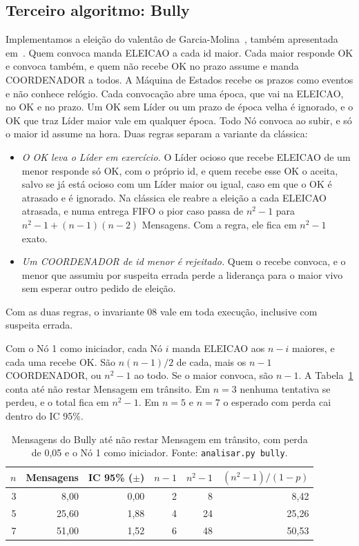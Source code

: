 \documentclass[conference]{IEEEtran}
\newcommand{\cod}[1]{\texttt{\upshape #1}}
\begin{document}
\subsection{Terceiro algoritmo: Bully}
Implementamos a eleição do valentão de Garcia-Molina~\cite{garciamolina}, também apresentada
em~\cite{vansteen}. Quem convoca manda ELEICAO a cada id maior. Cada maior responde OK e convoca
também, e quem não recebe OK no prazo assume e manda COORDENADOR a todos. A Máquina de Estados
recebe os prazos como eventos e não conhece relógio. Cada convocação abre uma época, que vai na
ELEICAO, no OK e no prazo. Um OK sem Líder ou um prazo de época velha é ignorado, e o OK que traz
Líder maior vale em qualquer época. Todo Nó convoca ao subir, e só o maior id assume na hora. Duas
regras separam a variante da clássica:
\begin{itemize}
\item \emph{O OK leva o Líder em exercício.} O Líder ocioso que recebe ELEICAO de um menor responde
só OK, com o próprio id, e quem recebe esse OK o aceita, salvo se já está ocioso com um Líder maior
ou igual, caso em que o OK é atrasado e é ignorado. Na clássica ele reabre a eleição a cada
ELEICAO atrasada, e numa entrega FIFO o pior caso passa de $n^2-1$ para $n^2-1+(n-1)(n-2)$
Mensagens. Com a regra, ele fica em $n^2-1$ exato.
\item \emph{Um COORDENADOR de id menor é rejeitado.} Quem o recebe convoca, e o menor que assumiu
por suspeita errada perde a liderança para o maior vivo sem esperar outro pedido de eleição.
\end{itemize}
Com as duas regras, o invariante 08 vale em toda execução, inclusive com suspeita errada.

Com o Nó 1 como iniciador, cada Nó $i$ manda ELEICAO aos $n-i$ maiores, e cada uma recebe OK. São
$n(n-1)/2$ de cada, mais os $n-1$ COORDENADOR, ou $n^2-1$ ao todo. Se o maior convoca, são $n-1$.
A Tabela~\ref{tab:bully} conta
até não restar Mensagem em trânsito. Em $n=3$ nenhuma tentativa se perdeu, e o total fica em
$n^2-1$. Em $n=5$ e $n=7$ o esperado com perda cai dentro do IC 95\%.

\begin{table}[t]
\caption{Mensagens do Bully até não restar Mensagem em trânsito, com perda de 0,05 e o Nó 1 como
iniciador. Fonte: \cod{analisar.py bully}.}
\label{tab:bully}
\centering
\footnotesize
\begin{tabular}{@{}rrrrrr@{}}
\toprule
$n$ & Mensagens & IC 95\% ($\pm$) & $n-1$ & $n^2-1$ & $(n^2-1)/(1-p)$ \\
\midrule
3 & 8,00  & 0,00 & 2 & 8  & 8,42  \\
5 & 25,60 & 1,88 & 4 & 24 & 25,26 \\
7 & 51,00 & 1,52 & 6 & 48 & 50,53 \\
\bottomrule
\end{tabular}
\end{table}
\end{document}

